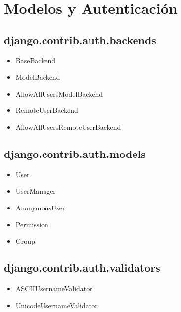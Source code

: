 \chapter{Modelos y Autenticación}

\section{django.contrib.auth.backends}

\begin{itemize}
	\item BaseBackend
	\item ModelBackend
	\item AllowAllUsersModelBackend
	\item RemoteUserBackend
	\item AllowAllUsersRemoteUserBackend
\end{itemize}

\section{django.contrib.auth.models}

\begin{itemize}
	\item User
	\item UserManager
	\item AnonymousUser
	\item Permission
	\item Group
\end{itemize}

\section{django.contrib.auth.validators}

\begin{itemize}
	\item ASCIIUsernameValidator
	\item UnicodeUsernameValidator
\end{itemize}
